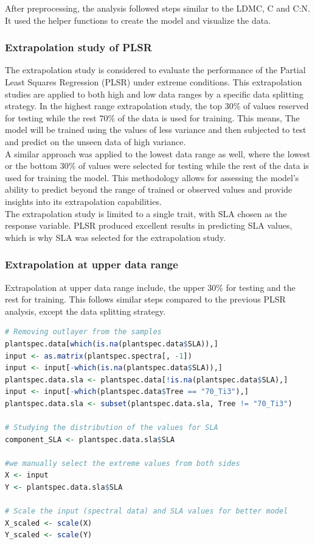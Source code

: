 \documentclass[12pt,a4paper]{report}
\begin{document}
After preprocessing, the analysis followed steps similar to the LDMC, C and C:N. It used the helper functions to create the model and visualize the data. 

\subsubsection{Extrapolation study of PLSR}
The extrapolation study is considered to evaluate the performance of the Partial Least Squares Regression (PLSR) under extreme conditions. This extrapolation studies are applied to both high and low data ranges by a specific data splitting strategy. In the highest range extrapolation study, the top $30\%$ of values reserved for testing while the rest $70\%$ of the data is used for training. This means, The model will be trained using the values of less variance and then subjected to test and predict on the unseen data of high variance.\\

A similar approach was applied to the lowest data range as well, where the lowest or the bottom $30\%$ of values were selected for testing while the rest of the data is used for training the model. This methodology allows for assessing the model's ability to predict beyond the range of trained or observed values and provide insights into its extrapolation capabilities.\\

The extrapolation study is limited to a single trait, with SLA chosen as the response variable. PLSR produced excellent results in predicting SLA values, which is why SLA was selected for the extrapolation study.

\subsubsection*{Extrapolation at upper data range}
Extrapolation at upper data range include, the upper $30\%$ for testing and the rest for training. This follows similar steps compared to the previous PLSR analysis, except the data splitting strategy.\\ 

\begin{lstlisting}[language=R, style=mystyle]
# Removing outlayer from the samples
plantspec.data[which(is.na(plantspec.data$SLA)),]
input <- as.matrix(plantspec.spectra[, -1])
input <- input[-which(is.na(plantspec.data$SLA)),]
plantspec.data.sla <- plantspec.data[!is.na(plantspec.data$SLA),]
input <- input[-which(plantspec.data$Tree == "70_Ti3"),]
plantspec.data.sla <- subset(plantspec.data.sla, Tree != "70_Ti3")

# Studying the distribution of the values for SLA
component_SLA <- plantspec.data.sla$SLA

#we manually select the extreme values from both sides
X <- input  
Y <- plantspec.data.sla$SLA  

# Scale the input (spectral data) and SLA values for better model
X_scaled <- scale(X)            
Y_scaled <- scale(Y)
\end{lstlisting}
\end{document}
